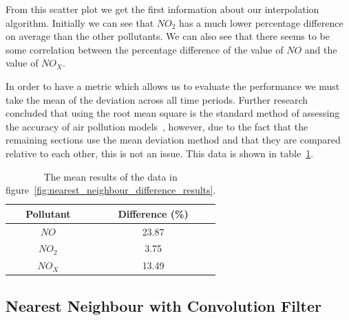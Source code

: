
			From this scatter plot we get the first information about our interpolation algorithm. Initially we can see that $NO_{2}$ has a much lower percentage difference on average than the other pollutants. We can also see that there seems to be some correlation between the percentage difference of the value of $NO$ and the value of $NO_{X}$. 

			In order to have a metric which allows us to evaluate the performance we must take the mean of the deviation across all time periods. Further research concluded that using the root mean square is the standard method of assessing the accuracy of air pollution models~\cite{spatiotemporalresolution}, however, due to the fact that the remaining sections use the mean deviation method and that they are compared relative to each other, this is not an issue. This data is shown in table~\ref{tab:nearest_neighbour_difference_results_mean}. 

			\begin{table}[H]
				\centering
	    		\begin{tabular}{|c|c|}
	    			\hline
			        Pollutant & Difference (\%) \\ \hline
					$NO$ & 23.87 \\
					$NO_{2}$ & 3.75 \\
					$NO_{X}$ & 13.49 \\ \hline
				\end{tabular}
				\caption{The mean results of the data in figure~\ref{fig:nearest_neighbour_difference_results}.}
				\label{tab:nearest_neighbour_difference_results_mean}
			\end{table}

		\subsection{Nearest Neighbour with Convolution Filter}\label{prediction_evaluation_results_nearest_neighbour_convolution_filter}


